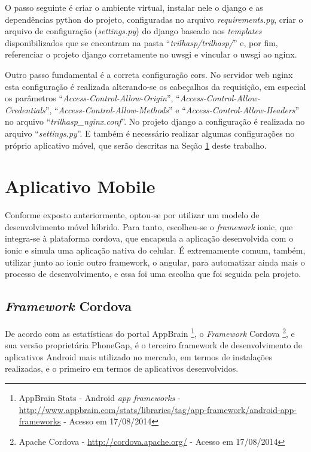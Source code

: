 O passo seguinte é criar o ambiente virtual, instalar nele o \gls{django} e as dependências python do projeto, configuradas no arquivo \textit{requirements.py}, criar o arquivo de configuração (\textit{settings.py}) do \gls{django} baseado nos \textit{templates} disponibilizados que se encontram na pasta ``\textit{trilhasp/trilhasp/}'' e, por fim, referenciar o projeto \gls{django} corretamente no \gls{uwsgi} e vincular o \gls{uwsgi} ao \gls{nginx}.

Outro passo fundamental é a correta configuração \gls{cors}. No servidor web \gls{nginx} esta configuração é realizada alterando-se os cabeçalhos da requisição, em especial os parâmetros ``\textit{Access-Control-Allow-Origin}'', ``\textit{Access-Control-Allow-Credentials}'', ``\textit{Access-Control-Allow-Methods}'' e ``\textit{Access-Control-Allow-Headers}'' no arquivo ``\textit{trilhasp\_nginx.conf}''. No projeto \gls{django} a configuração é realizada no arquivo ``\textit{settings.py}''. E também é necessário realizar algumas configurações no próprio aplicativo móvel, que serão descritas na Seção \ref{sec:spec-appmobile} deste trabalho.

\section{Aplicativo Mobile}\label{sec:spec-appmobile}
Conforme exposto anteriormente, optou-se por utilizar um modelo de desenvolvimento móvel híbrido. Para tanto, escolheu-se o \textit{framework} \gls{ionic}, que integra-se à plataforma \gls{cordova}, que encapsula a aplicação desenvolvida com o \gls{ionic} e simula uma aplicação nativa do celular. É extremamente comum, também, utilizar junto ao \gls{ionic} outro framework, o \gls{angular}, para automatizar ainda mais o processo de desenvolvimento, e essa foi uma escolha que foi seguida pela projeto.

\subsection{\textit{Framework} Cordova}
De acordo com as estatísticas do portal AppBrain%
\footnote{AppBrain Stats - Android \textit{app frameworks} - \url{http://www.appbrain.com/stats/libraries/tag/app-framework/android-app-frameworks} - Acesso em 17/08/2014},
o \textit{Framework} Cordova%
\footnote{Apache Cordova - \url{http://cordova.apache.org/} - Acesso em 17/08/2014},
e sua versão proprietária PhoneGap, é o terceiro framework de desenvolvimento de aplicativos Android mais utilizado no mercado, em termos de instalações realizadas, e o primeiro em termos de aplicativos desenvolvidos.

